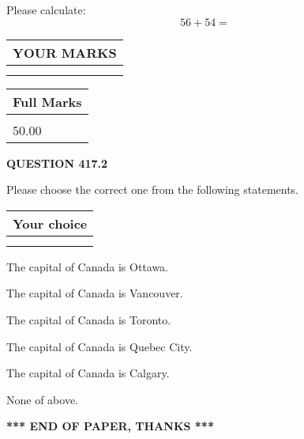 \documentclass[12pt]{article}
\begin{document}
  
 
Please calculate:
\begin{equation}
56 +  %
54 = \nonumber
\end{equation}
 

 

 
  
\vspace{0.2in}
  
\noindent\begin{tabular}{|l|}
\hline
 YOUR MARKS  \\
\hline
 \\ 
 \\ 
\hline
\end{tabular}
\hspace{0.05in} \begin{tabular}{|l|}
\hline
 Full Marks  \\
\hline
 \\ 
50.00 \\
\hline
\end{tabular}
{\textbf{\Large{QUESTION
417.2 
}}}
  
  
Please choose the correct one from the following statements.
  
  
\noindent\hspace{3.0in} \begin{tabular}{|l|}
\hline
Your choice \\
\hline
 \\ 
 \\ 
\hline
\end{tabular}
  
  
 
 
The capital of Canada is Ottawa.
 
 
The capital of Canada is Vancouver.
 
 
The capital of Canada is Toronto.
 
 
The capital of Canada is Quebec City.
 
 
The capital of Canada is Calgary.
 
 
 None of above.
 
 
   
   
 \vspace{0.2in}
 
   
   
   
   
\vspace{1.0in} 
{\textbf{\large{ *** END OF PAPER, THANKS *** }}} 
   
\end{document}
